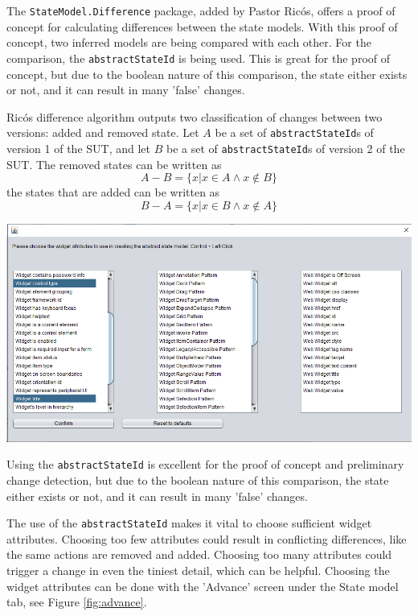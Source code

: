 
The \verb|StateModel.Difference| package, added by Pastor Ricós\cite{stateDiff}, offers a proof of concept for calculating differences between the state models. With this proof of concept, two inferred models are being compared with each other. For the comparison, the \verb|abstractStateId| is being used. This is great for the proof of concept, but due to the boolean nature of this comparison, the state either exists or not, and it can result in many 'false' changes. 



Ricós difference algorithm\cite{stateDiff} outputs two classification of changes between two versions: added and removed state. Let $A$ be a set of \verb|abstractStateId|s of version 1 of the SUT, and let $B$ be a set of \verb|abstractStateId|s of version 2 of the SUT. The removed states can be written as
\[A-B = \lbrace x | x \in A \wedge x \notin B \rbrace\]
the states that are added can be written as
\[B-A = \lbrace x | x \in B \wedge x \notin A \rbrace\]

\begingroup
\captionsetup{type=figure}
\includegraphics[scale=0.5]{pics/attributes-state-model.png}
\label{fig:advance}
\endgroup

Using the \verb|abstractStateId| is excellent for the proof of concept and preliminary change detection, 
but due to the boolean nature of this comparison, the state either exists or not, and it can result in many 'false' changes.



The use of the \verb|abstractStateId| makes it vital to choose sufficient widget attributes. Choosing too few attributes could result in conflicting differences, like the same actions are removed and added. Choosing too many attributes could trigger a change in even the tiniest detail, which can be helpful. Choosing the widget attributes can be done with the 'Advance' screen under the State model tab, see Figure \ref{fig:advance}.

